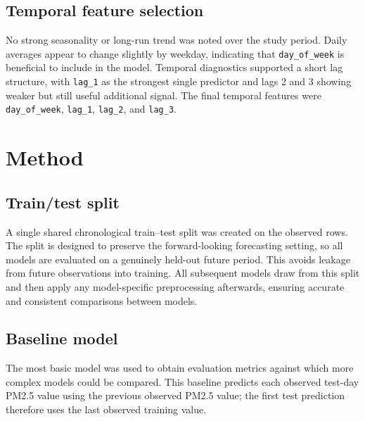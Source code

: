 \documentclass[11pt,a4paper]{article}
\begin{document}
	
	\subsection*{Temporal feature selection}
	
	No strong seasonality or long-run trend was noted over the study period. Daily averages appear to change slightly by weekday, indicating that \texttt{day\_of\_week} is beneficial to include in the model. Temporal diagnostics supported a short lag structure, with \texttt{lag\_1} as the strongest single predictor and lags 2 and 3 showing weaker but still useful additional signal. The final temporal features were \texttt{day\_of\_week}, \texttt{lag\_1}, \texttt{lag\_2}, and \texttt{lag\_3}.
	
	\vspace{2cm}
	
	
	\section{Method}
	
	\subsection*{Train/test split}
	
	A single shared chronological train--test split was created on the observed rows. The split is designed to preserve the forward-looking forecasting setting, so all models are evaluated on a genuinely held-out future period. This avoids leakage from future observations into training. All subsequent models draw from this split and then apply any model-specific preprocessing afterwards, ensuring accurate and consistent comparisons between models.
	
	\subsection*{Baseline model}
	
	The most basic model was used to obtain evaluation metrics against which more complex models could be compared. This baseline predicts each observed test-day PM2.5 value using the previous observed PM2.5 value; the first test prediction therefore uses the last observed training value.
	
\end{document}
